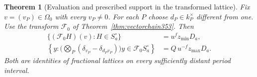 \documentclass[a4paper,11pt]{article}
\newtheorem{theorem}[proposition]{Theorem}
\theoremstyle{definition}
\theoremstyle{remark}
\numberwithin{equation}{section}
\begin{document}
\begin{theorem}[Evaluation and prescribed support in the transformed lattice]\leavevmode
\label{thm:pointlattice353}
Fix \(v=(v_P)\in\Omega_0\) with every \(v_P\ne0\). For each
\(P\) choose \(d_P\in k_P^\times\) different from one.
Use the transform \(\mathcal F_0\) of
Theorem~\ref{thm:vectorchain353}. Then
\[
 \begin{aligned}
   \{(\mathcal F_0 H)(v):H\in S_a^\circ\}
         &=u^f z_{\min} D_a,\\
   \left\{y:
      \Big(\bigotimes_P(\delta_{v_P}-\delta_{d_Pv_P})\Big)y
                         \in\mathcal F_0 S_a^\circ\right\}
         &=Q\,u^{-f} z_{\max}D_a .
 \end{aligned}
\]
Both are identities of fractional lattices on every sufficiently
distant period interval.
\end{theorem}
\end{document}
